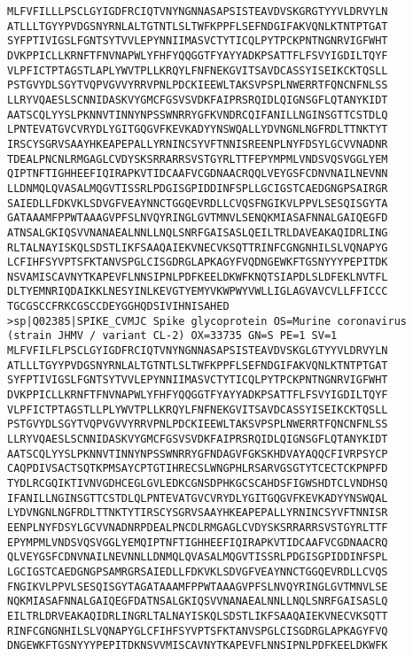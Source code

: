 \begin{lstlisting}
MLFVFILLLPSCLGYIGDFRCIQTVNYNGNNASAPSISTEAVDVSKGRGTYYVLDRVYLN
ATLLLTGYYPVDGSNYRNLALTGTNTLSLTWFKPPFLSEFNDGIFAKVQNLKTNTPTGAT
SYFPTIVIGSLFGNTSYTVVLEPYNNIIMASVCTYTICQLPYTPCKPNTNGNRVIGFWHT
DVKPPICLLKRNFTFNVNAPWLYFHFYQQGGTFYAYYADKPSATTFLFSVYIGDILTQYF
VLPFICTPTAGSTLAPLYWVTPLLKRQYLFNFNEKGVITSAVDCASSYISEIKCKTQSLL
PSTGVYDLSGYTVQPVGVVYRRVPNLPDCKIEEWLTAKSVPSPLNWERRTFQNCNFNLSS
LLRYVQAESLSCNNIDASKVYGMCFGSVSVDKFAIPRSRQIDLQIGNSGFLQTANYKIDT
AATSCQLYYSLPKNNVTINNYNPSSWNRRYGFKVNDRCQIFANILLNGINSGTTCSTDLQ
LPNTEVATGVCVRYDLYGITGQGVFKEVKADYYNSWQALLYDVNGNLNGFRDLTTNKTYT
IRSCYSGRVSAAYHKEAPEPALLYRNINCSYVFTNNISREENPLNYFDSYLGCVVNADNR
TDEALPNCNLRMGAGLCVDYSKSRRARRSVSTGYRLTTFEPYMPMLVNDSVQSVGGLYEM
QIPTNFTIGHHEEFIQIRAPKVTIDCAAFVCGDNAACRQQLVEYGSFCDNVNAILNEVNN
LLDNMQLQVASALMQGVTISSRLPDGISGPIDDINFSPLLGCIGSTCAEDGNGPSAIRGR
SAIEDLLFDKVKLSDVGFVEAYNNCTGGQEVRDLLCVQSFNGIKVLPPVLSESQISGYTA
GATAAAMFPPWTAAAGVPFSLNVQYRINGLGVTMNVLSENQKMIASAFNNALGAIQEGFD
ATNSALGKIQSVVNANAEALNNLLNQLSNRFGAISASLQEILTRLDAVEAKAQIDRLING
RLTALNAYISKQLSDSTLIKFSAAQAIEKVNECVKSQTTRINFCGNGNHILSLVQNAPYG
LCFIHFSYVPTSFKTANVSPGLCISGDRGLAPKAGYFVQDNGEWKFTGSNYYYPEPITDK
NSVAMISCAVNYTKAPEVFLNNSIPNLPDFKEELDKWFKNQTSIAPDLSLDFEKLNVTFL
DLTYEMNRIQDAIKKLNESYINLKEVGTYEMYVKWPWYVWLLIGLAGVAVCVLLFFICCC
TGCGSCCFRKCGSCCDEYGGHQDSIVIHNISAHED
>sp|Q02385|SPIKE_CVMJC Spike glycoprotein OS=Murine coronavirus (strain JHMV / variant CL-2) OX=33735 GN=S PE=1 SV=1
MLFVFILFLPSCLGYIGDFRCIQTVNYNGNNASAPSISTEAVDVSKGLGTYYVLDRVYLN
ATLLLTGYYPVDGSNYRNLALTGTNTLSLTWFKPPFLSEFNDGIFAKVQNLKTNTPTGAT
SYFPTIVIGSLFGNTSYTVVLEPYNNIIMASVCTYTICQLPYTPCKPNTNGNRVIGFWHT
DVKPPICLLKRNFTFNVNAPWLYFHFYQQGGTFYAYYADKPSATTFLFSVYIGDILTQYF
VLPFICTPTAGSTLLPLYWVTPLLKRQYLFNFNEKGVITSAVDCASSYISEIKCKTQSLL
PSTGVYDLSGYTVQPVGVVYRRVPNLPDCKIEEWLTAKSVPSPLNWERRTFQNCNFNLSS
LLRYVQAESLSCNNIDASKVYGMCFGSVSVDKFAIPRSRQIDLQIGNSGFLQTANYKIDT
AATSCQLYYSLPKNNVTINNYNPSSWNRRYGFNDAGVFGKSKHDVAYAQQCFIVRPSYCP
CAQPDIVSACTSQTKPMSAYCPTGTIHRECSLWNGPHLRSARVGSGTYTCECTCKPNPFD
TYDLRCGQIKTIVNVGDHCEGLGVLEDKCGNSDPHKGCSCAHDSFIGWSHDTCLVNDHSQ
IFANILLNGINSGTTCSTDLQLPNTEVATGVCVRYDLYGITGQGVFKEVKADYYNSWQAL
LYDVNGNLNGFRDLTTNKTYTIRSCYSGRVSAAYHKEAPEPALLYRNINCSYVFTNNISR
EENPLNYFDSYLGCVVNADNRPDEALPNCDLRMGAGLCVDYSKSRRARRSVSTGYRLTTF
EPYMPMLVNDSVQSVGGLYEMQIPTNFTIGHHEEFIQIRAPKVTIDCAAFVCGDNAACRQ
QLVEYGSFCDNVNAILNEVNNLLDNMQLQVASALMQGVTISSRLPDGISGPIDDINFSPL
LGCIGSTCAEDGNGPSAMRGRSAIEDLLFDKVKLSDVGFVEAYNNCTGGQEVRDLLCVQS
FNGIKVLPPVLSESQISGYTAGATAAAMFPPWTAAAGVPFSLNVQYRINGLGVTMNVLSE
NQKMIASAFNNALGAIQEGFDATNSALGKIQSVVNANAEALNNLLNQLSNRFGAISASLQ
EILTRLDRVEAKAQIDRLINGRLTALNAYISKQLSDSTLIKFSAAQAIEKVNECVKSQTT
RINFCGNGNHILSLVQNAPYGLCFIHFSYVPTSFKTANVSPGLCISGDRGLAPKAGYFVQ
DNGEWKFTGSNYYYPEPITDKNSVVMISCAVNYTKAPEVFLNNSIPNLPDFKEELDKWFK

\end{lstlisting}
